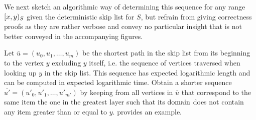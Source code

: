 We next sketch an algorithmic way of determining this sequence for any range $[{x},{y})_{S}$ given the deterministic skip list for $S$, but refrain from giving correctness proofs as they are rather verbose and convey no particular insight that is not better conveyed in the accompanying figures.

Let $\bar{u} = (u_0, u_1, \ldots, u_m)$ be the shortest path in the skip list from its beginning to the vertex $y$ excluding $y$ itself, i.e. the sequence of vertices traversed when looking up $y$ in the skip list. This sequence has expected logarithmic length and can be computed in expected logarithmic time. Obtain a shorter sequence $\bar{u'} = (u'_0, u'_1, \ldots, u'_{m'})$ by keeping from all vertices in $\bar{u}$ that correspond to the same item the one in the greatest layer such that its $\operatorname{domain}$ does not contain any item greater than or equal to $y$.  provides an example.

